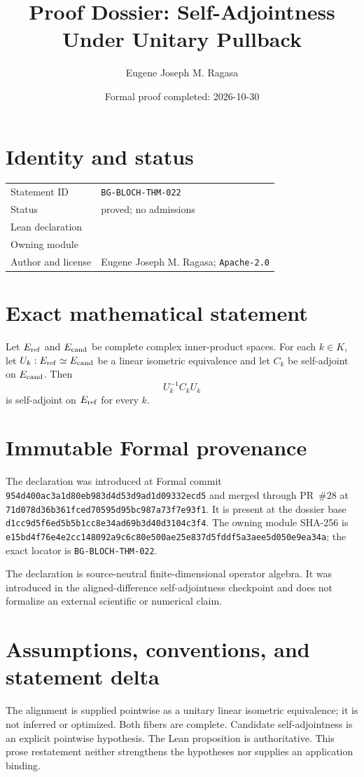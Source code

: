 \documentclass[11pt]{article}
\title{Proof Dossier: Self-Adjointness Under Unitary Pullback}
\author{Eugene Joseph M. Ragasa}
\date{Formal proof completed: 2026-10-30}
\begin{document}
\raggedright
\maketitle

\section{Identity and status}
\begin{tabularx}{\textwidth}{@{}lY@{}}
\toprule
Statement ID & \texttt{BG-BLOCH-THM-022} \\
Status & proved; no admissions \\
Lean declaration &  \\
Owning module &  \\
Author and license & Eugene Joseph M. Ragasa; \texttt{Apache-2.0} \\
\bottomrule
\end{tabularx}

\section{Exact mathematical statement}
Let $E_{\rm ref}$ and $E_{\rm cand}$ be complete complex inner-product spaces.  For each $k\in K$, let $U_k:E_{\rm ref}\simeq E_{\rm cand}$ be a linear isometric equivalence and let $C_k$ be self-adjoint on $E_{\rm cand}$.  Then
\[
  U_k^{-1}C_kU_k
\]
is self-adjoint on $E_{\rm ref}$ for every $k$.

\section{Immutable Formal provenance}
The declaration was introduced at Formal commit
\texttt{954d400ac3a1d80eb983d4d53d9ad1d09332ecd5} and merged through PR~\#28 at
\texttt{71d078d36b361fced70595d95bc987a73f7e93f1}.  It is present at the dossier base
\texttt{d1cc9d5f6ed5b5b1cc8e34ad69b3d40d3104c3f4}.  The owning module SHA-256 is
\texttt{e15bd4f76e4e2cc148092a9c6c80e500ae25e837d5fddf5a3aee5d050e9ea34a}; the exact locator is \texttt{BG-BLOCH-THM-022}.

The declaration is source-neutral finite-dimensional operator algebra.  It was introduced in the aligned-difference self-adjointness checkpoint and does not formalize an external scientific or numerical claim.

\section{Assumptions, conventions, and statement delta}
The alignment is supplied pointwise as a unitary linear isometric equivalence; it is not inferred or optimized.  Both fibers are complete.  Candidate self-adjointness is an explicit pointwise hypothesis.
The Lean proposition is authoritative.  This prose restatement neither strengthens the hypotheses
nor supplies an application binding.
\end{document}

